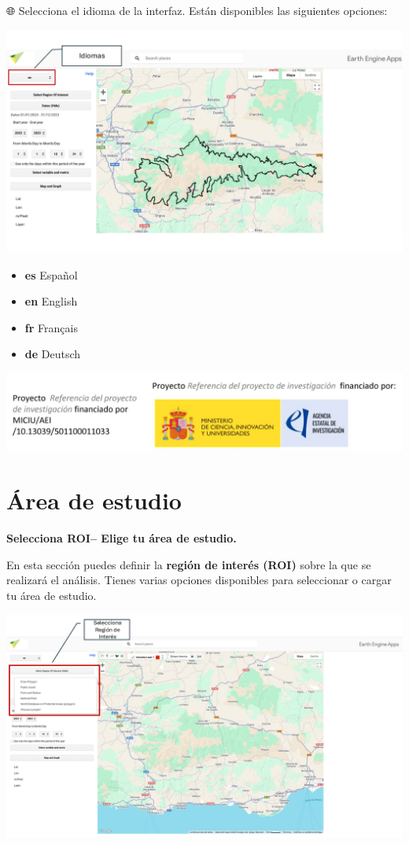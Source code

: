 \documentclass[
]{book}
\begin{document}
🌐 Selecciona el idioma de la interfaz. Están disponibles las siguientes opciones:

\includegraphics{assets/Idiomas.png}

\begin{itemize}
\item
  \textbf{es}
  Español
\item
  \textbf{en}
  English
\item
  \textbf{fr}
  Français
\item
  \textbf{de}
  Deutsch
\end{itemize}

\includegraphics{assets/logo.jpeg}

\chapter{Área de estudio}\label{area-estudio}

\textbf{Selecciona ROI-- Elige tu área de estudio.}

En esta sección puedes definir la \textbf{región de interés (ROI)} sobre la que se realizará el análisis. Tienes varias opciones disponibles para seleccionar o cargar tu área de estudio.

\includegraphics{assets/ROI_es.png}
\end{document}
